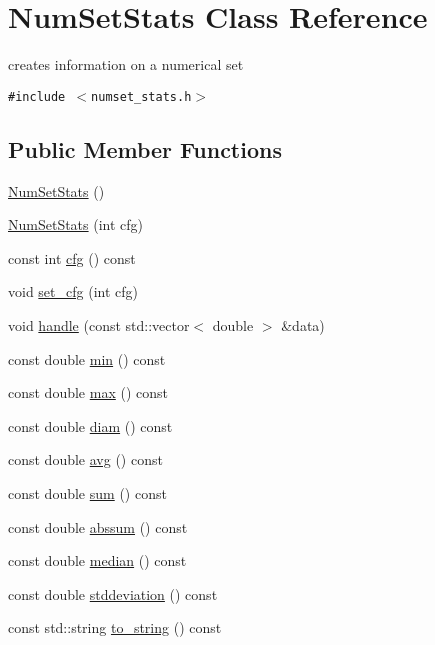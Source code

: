 \hypertarget{class_num_set_stats}{
\section{NumSetStats Class Reference}
\label{class_num_set_stats}
}
creates information on a numerical set  


{\tt \#include $<$numset\_\-stats.h$>$}

\subsection*{Public Member Functions}
\begin{CompactItemize}
\item 
\hyperlink{class_num_set_stats_889c116c12f1f1d08b71c78393abc2e4}{NumSetStats} ()
\item 
\hyperlink{class_num_set_stats_6453c26039df38b6a9dd8e5c039d1db1}{NumSetStats} (int cfg)
\item 
const int \hyperlink{class_num_set_stats_93c7b65ee1d6b2b618cf6d4fff0909ee}{cfg} () const 
\item 
void \hyperlink{class_num_set_stats_6306db6c6b350053c548421871ff9599}{set\_\-cfg} (int cfg)
\item 
void \hyperlink{class_num_set_stats_097be7d38f92b8618f9c5f5e8e86d07b}{handle} (const std::vector$<$ double $>$ \&data)
\item 
const double \hyperlink{class_num_set_stats_a20ab577f51080f3798a825a6392fda2}{min} () const 
\item 
const double \hyperlink{class_num_set_stats_ca1e3149eda7dc53aa884b577f61a12f}{max} () const 
\item 
const double \hyperlink{class_num_set_stats_36ddcdd2cdc3c01ae0b5253e26f3599e}{diam} () const 
\item 
const double \hyperlink{class_num_set_stats_c89ea68555e034fc8ad61a24e8105bbc}{avg} () const 
\item 
const double \hyperlink{class_num_set_stats_8576d0ce14fa99580e6f78666c841637}{sum} () const 
\item 
const double \hyperlink{class_num_set_stats_09c585c3187b3355b9c4e4f20bdef394}{abssum} () const 
\item 
const double \hyperlink{class_num_set_stats_09e5689d2b6635e1f7bf42cfb38d511c}{median} () const 
\item 
const double \hyperlink{class_num_set_stats_e531b9144515a839e21b0a9c9c74daae}{stddeviation} () const 
\item 
const std::string \hyperlink{class_num_set_stats_639732de39c31d82ade97d8e204db3c0}{to\_\-string} () const 
\end{CompactItemize}
